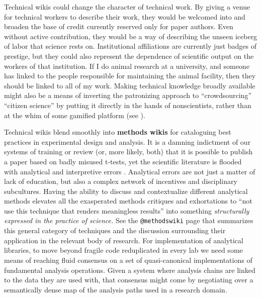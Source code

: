 Technical wikis could change the character of technical work. By giving
a venue for technical workers to describe their work, they would be
welcomed into and broaden the base of credit currently reserved only for
paper authors. Even without active contribution, they would be a way of
describing the unseen iceberg of labor that science rests on.
Institutional affiliations are currently just badges of prestige, but
they could also represent the dependence of scientific output on the
workers of that institution. If I do animal research at a university,
and someone has linked to the people responsible for maintaining the
animal facility, then they should be linked to all of my work. Making
technical knowledge broadly available might also be a means of inverting
the patronizing approach to ``crowdsourcing'' ``citizen science'' by
putting it directly in the hands of nonscientists, rather than at the
whim of some gamified platform (see \citep{delangeShortTimeBig2022} ).

Technical wikis blend smoothly into \textbf{methods wikis} for
cataloguing best practices in experimental design and analysis. It is a
damning indictment of our systems of training or review (or, more
likely, both) that it is possible to publish a paper based on badly
misused t-tests, yet the scientific literature is flooded with
analytical and interpretive errors \citep{strasakStatisticalErrorsMedical2007, brownIssuesDataAnalyses2018, leekStatisticsValuesAre2015} . Analytical errors are not just a
matter of lack of education, but also a complex network of incentives
and disciplinary subcultures. Having the ability to discuss and
contextualize different analytical methods elevates all the exasperated
methods critiques and exhortations to ``not use this technique that
renders meaningless results'' into something \emph{structurally
expressed in the practice of science.} See the \texttt{@methodswiki}
page that summarizes this general category of techniques and the
discussion surrounding their application in the relevant body of
research. For implementation of analytical libraries, to move beyond
fragile code reduplicated in every lab we need some means of reaching
fluid consensus on a set of quasi-canonical implementations of
fundamental analysis operations. Given a system where analysis chains
are linked to the data they are used with, that consensus might come by
negotiating over a semantically dense map of the analysis paths used in
a research domain.

